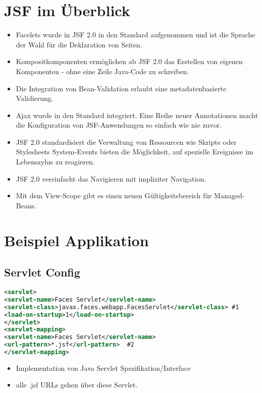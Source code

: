 \documentclass[a4paper,10pt]{scrreprt}
\begin{document}
{\section{JSF im Überblick}
\begin{itemize}
 \item Facelets wurde in JSF 2.0 in den Standard aufgenommen und ist die Sprache der Wahl für die
Deklaration von Seiten.
\item Kompositkomponenten ermöglichen ab JSF 2.0 das Erstellen von eigenen Komponenten - ohne
eine Zeile Java-Code zu schreiben.
\item Die Integration von Bean-Validation erlaubt eine metadatenbasierte Validierung.
\item Ajax wurde in den Standard integriert.
Eine Reihe neuer Annotationen macht die Konfiguration von JSF-Anwendungen so einfach wie
nie zuvor.
\item JSF 2.0 standardisiert die Verwaltung von Ressourcen wie Skripte oder Stylesheets
System-Events bieten die Möglichkeit, auf spezielle Ereignisse im Lebenszylus zu reagieren.
\item JSF 2.0 vereinfacht das Navigieren mit impliziter Navigation.
\item Mit dem View-Scope gibt es einen neuen Gültigkeitsbereich für Managed-Beans.
\end{itemize}

\section{Beispiel Applikation}
\subsection{Servlet Config}
\begin{lstlisting}[caption=JSF Web Config,language=xml]
 <servlet>
<servlet-name>Faces Servlet</servlet-name>
<servlet-class>javax.faces.webapp.FacesServlet</servlet-class> #1
<load-on-startup>1</load-on-startup>
</servlet>
<servlet-mapping>
<servlet-name>Faces Servlet</servlet-name>
<url-pattern>*.jsf</url-pattern>  #2
</servlet-mapping>
 \end{lstlisting}
\begin{itemize}
 \item Implementation von Java Servlet Spezifikation/Interface
 \item alle .jsf URLs gehen über diese Servlet.
\end{itemize}
}
\end{document}
